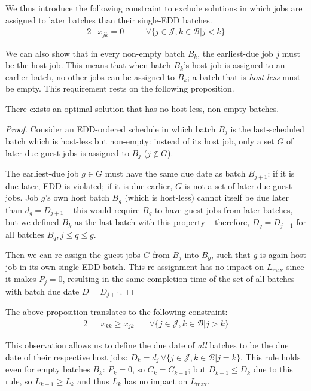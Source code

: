 \documentclass[oribibl]{llncs}
\def\Lmax{{L_{\mathrm{max}}}}
\begin{document}
We thus introduce the following constraint to exclude solutions
in which jobs are assigned to later batches than their single-EDD
batches.
\begin{alignat}{2}
  & x_{jk} = 0 \quad && \forall \{j \in \mathcal{J}, k \in \mathcal{B} | j < k\} \label{eq:mipnopp}
\end{alignat}

We can also show that in every non-empty batch $B_k$,
the earliest-due job $j$ must be the host job.
This means that when batch $B_k$'s host job is assigned to an
earlier batch, no other jobs can be assigned to $B_k$; a batch
that is \textit{host-less} must be empty. This requirement rests on the
following proposition.

\begin{proposition}\label{prop:nohostless}
There exists an optimal solution that has no host-less, non-empty batches.
\end{proposition}
\begin{proof}
Consider an EDD-ordered schedule in which batch $B_j$ is the
last-scheduled batch which is host-less but non-empty: instead of its host job, only a set $G$ of later-due guest jobs is assigned
to $B_j$ ($j \notin G$).

The earliest-due job $g \in G$ must have the same due date as batch
$B_{j+1}$: if it is due later, EDD is violated; if it is due earlier,
$G$ is not a set of later-due guest jobs. Job $g$'s own host batch $B_g$
(which is host-less) cannot itself be due later than $d_g = D_{j+1}$ --
this would require $B_g$ to have guest jobs from later batches, but we
defined $B_k$ as the last batch with this property -- therefore, $D_q =
D_{j+1}$ for all batches $B_q, j \leq q \leq g$.

Then we can re-assign the guest jobs $G$ from $B_j$ into $B_g$,
such that $g$ is again host job in its own single-EDD batch. This
re-assignment has no impact on $\Lmax$ since it makes $P_j = 0$,
resulting in the same completion time of the set of all batches with
batch due date $D = D_{j+1}$.
\end{proof}

The above proposition translates to the following constraint:
\begin{alignat}{2}
  && x_{kk} \geq x_{jk} \quad & \forall\{j \in \mathcal{J}, k \in \mathcal{B} |
j> k\}
\end{alignat}

This observation allows us to define the due date of \emph{all} batches
to be the due date of their respective host jobs: $D_k = d_j\,\forall\{j
\in \mathcal{J}, k \in \mathcal{B}|j=k\}$. This rule holds
even for empty batches $B_k$: $P_k = 0$, so $C_k = C_{k-1}$; but
$D_{k-1} \leq D_k$ due to this rule, so $L_{k-1} \geq L_k$ and thus
$L_k$ has no impact on $\Lmax$.
\end{document}
